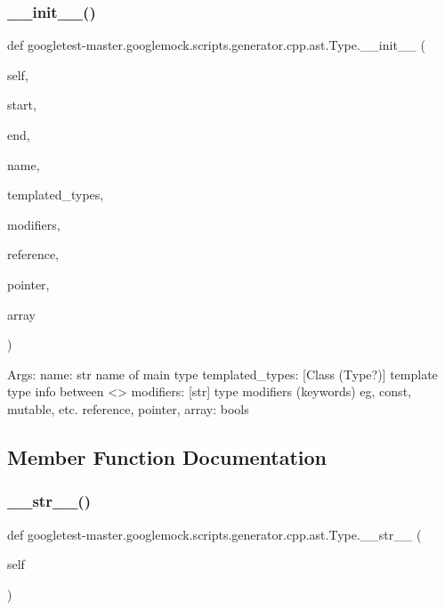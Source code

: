 \subsubsection{\texorpdfstring{\_\_init\_\_()}{\_\_init\_\_()}}
{\footnotesize\ttfamily def googletest-\/master.\+googlemock.\+scripts.\+generator.\+cpp.\+ast.\+Type.\+\_\+\+\_\+init\+\_\+\+\_\+ (\begin{DoxyParamCaption}\item[{}]{self,  }\item[{}]{start,  }\item[{}]{end,  }\item[{}]{name,  }\item[{}]{templated\+\_\+types,  }\item[{}]{modifiers,  }\item[{}]{reference,  }\item[{}]{pointer,  }\item[{}]{array }\end{DoxyParamCaption})}

\begin{DoxyVerb}Args:
  name: str name of main type
  templated_types: [Class (Type?)] template type info between <>
  modifiers: [str] type modifiers (keywords) eg, const, mutable, etc.
  reference, pointer, array: bools
\end{DoxyVerb}
 

\subsection{Member Function Documentation}
\mbox{\label{classgoogletest-master_1_1googlemock_1_1scripts_1_1generator_1_1cpp_1_1ast_1_1_type_aad6c4232a5a38edc8d4166b6febfbe8a}} 
\subsubsection{\texorpdfstring{\_\_str\_\_()}{\_\_str\_\_()}}
{\footnotesize\ttfamily def googletest-\/master.\+googlemock.\+scripts.\+generator.\+cpp.\+ast.\+Type.\+\_\+\+\_\+str\+\_\+\+\_\+ (\begin{DoxyParamCaption}\item[{}]{self }\end{DoxyParamCaption})}

